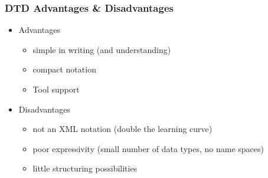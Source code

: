 \documentclass[11pt]{article}
\begin{document}
\subsubsection{DTD Advantages \& Disadvantages}
\label{sec:orgb3972ed}
\begin{itemize}
\item Advantages
\begin{itemize}
\item simple in writing (and understanding)
\item compact notation
\item Tool support
\end{itemize}
\item Disadvantages
\begin{itemize}
\item not an XML notation (double the learning curve)
\item poor expressivity (small number of data types, no name spaces)
\item little structuring possibilities
\end{itemize}
\end{itemize}
\end{document}
